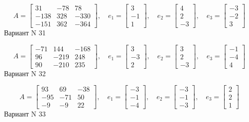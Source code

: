 \documentclass[11pt]{report}
\begin{document}
$$A = \left[\begin{matrix}31 & -78 & 78\\-138 & 328 & -330\\-151 & 362 & -364\end{matrix}\right],\quad e_1 = \left[\begin{matrix}3\\-1\\1\end{matrix}\right],\quad e_2 = \left[\begin{matrix}4\\2\\-3\end{matrix}\right],\quad e_3 = \left[\begin{matrix}-3\\-2\\3\end{matrix}\right]$$Вариант N 31

$$A = \left[\begin{matrix}-71 & 144 & -168\\96 & -219 & 248\\90 & -210 & 235\end{matrix}\right],\quad e_1 = \left[\begin{matrix}3\\-3\\2\end{matrix}\right],\quad e_2 = \left[\begin{matrix}3\\2\\-3\end{matrix}\right],\quad e_3 = \left[\begin{matrix}-1\\-4\\4\end{matrix}\right]$$Вариант N 32

$$A = \left[\begin{matrix}93 & 69 & -38\\-95 & -71 & 50\\-9 & -9 & 22\end{matrix}\right],\quad e_1 = \left[\begin{matrix}-3\\-1\\-4\end{matrix}\right],\quad e_2 = \left[\begin{matrix}-3\\-1\\-3\end{matrix}\right],\quad e_3 = \left[\begin{matrix}2\\2\\1\end{matrix}\right]$$Вариант N 33
\end{document}

